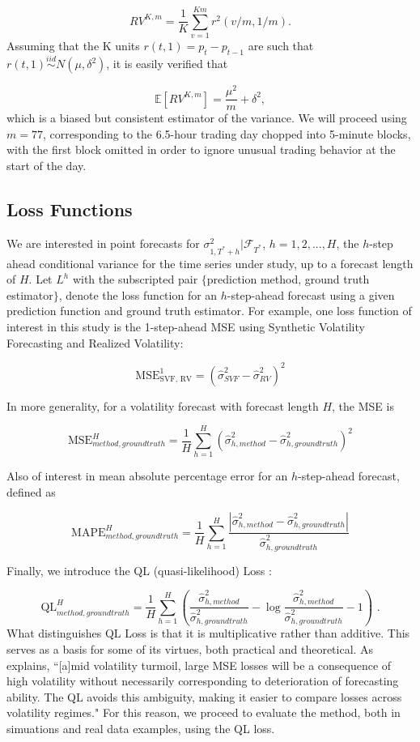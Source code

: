 \documentclass[11pt]{article}
\newcommand{\simiid}{\stackrel{iid}{\sim}} %
\def\E{\mathbb{E}} %
\theoremstyle{definition}
\begin{document}
    $$RV^{K,m} = \frac{1}{K}\sum^{Km}_{v=1}r^{2}(v/m,1/m).$$
    Assuming that the K units $r(t, 1) = p_{t} - p_{t-1}$ are such that $r(t, 1) \simiid N(\mu, \delta^{2})$, it is easily verified that 
    
    $$\E[RV^{K,m}] = \frac{\mu^{2}}{m} + \delta^{2},$$
    which is a biased but consistent estimator of the variance.  We will proceed using $m = 77$, corresponding to the 6.5-hour trading day chopped into 5-minute blocks, with the first block omitted in order to ignore unusual trading behavior at the start of the day.

\subsection{Loss Functions}

We are interested in point forecasts for $\sigma^{2}_{1,T^{*}+h}|\mathcal{F}_{T^{*}}$, $h=1,2,...,H$, the $h$-step ahead conditional variance for the time series under study, up to a forecast length of $H$.  Let $L^{h}$ with the subscripted pair $\{$prediction method, ground truth estimator$\}$, denote the loss function for an $h$-step-ahead forecast using a given prediction function and ground truth estimator.  For example, one loss function of interest in this study is the 1-step-ahead MSE using Synthetic Volatility Forecasting and Realized Volatility:

$$ \text{MSE}^{1}_{\text{SVF, RV}} = (\hat\sigma^{2}_{SVF} - \hat\sigma^{2}_{RV})^{2}$$

In more generality, for a volatility forecast with forecast length $H$, the MSE is 

$$ \text{MSE}^{H}_{method, ground truth} = \frac{1}{H}\sum_{h=1}^{H}(\hat\sigma^{2}_{h, method} - \hat\sigma^{2}_{h, ground truth})^{2}$$

Also of interest in mean absolute percentage error for an $h$-step-ahead forecast, defined as

\[ 
\text{MAPE}^{H}_{method, ground truth} = \frac{1}{H}\sum_{h=1}^{H}\frac{|\hat\sigma^{2}_{h, method} - \hat\sigma^{2}_{h, ground truth}|}{\hat\sigma^{2}_{h, ground truth}}
\]

Finally, we introduce the QL (quasi-likelihood) Loss \citep{brownlees2011practical}:

\[ 
\text{QL}^{H}_{method, ground truth} = \frac{1}{H}\sum_{h=1}^{H} (\frac{ \hat\sigma^{2}_{h, method} }{\hat\sigma^{2}_{h, ground truth}} - \log{\frac{ \hat\sigma^{2}_{h, method} }{\hat\sigma^{2}_{h, ground truth}}} -1) \text{ .}
\]
What distinguishes QL Loss is that it is multiplicative rather than additive.  This serves as a basis for some of its virtues, both practical and theoretical.  As \citet{brownlees2011practical} explains, ``[a]mid volatility turmoil, large MSE
losses will be a consequence of high volatility without necessarily corresponding to
deterioration of forecasting ability. The QL avoids this ambiguity, making it easier to
compare losses across volatility regimes."  For this reason, we proceed to evaluate the method, both in simuations and real data examples, using the QL loss.
\end{document}
